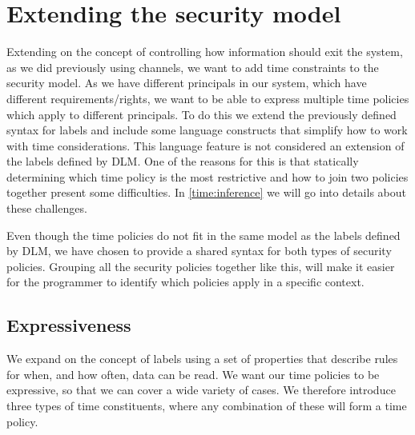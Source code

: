 
\section{Extending the security model}
Extending on the concept of controlling how information should exit the system, as we did previously using channels, we want to add time constraints to the security model.
As we have different principals in our system, which have different requirements/rights, we want to be able to express multiple time policies which apply to different principals.
To do this we extend the previously defined syntax for labels and include some language constructs that simplify how to work with time considerations.
This language feature is not considered an extension of the labels defined by DLM.
One of the reasons for this is that statically determining which time policy is the most restrictive and how to join two policies together present some difficulties.
In \cref{time:inference} we will go into details about these challenges.

Even though the time policies do not fit in the same model as the labels defined by DLM, we have chosen to provide a shared syntax for both types of security policies.
Grouping all the security policies together like this, will make it easier for the programmer to identify which policies apply in a specific context.

\subsection{Expressiveness}\label{time:expressiveness}
We expand on the concept of labels using a set of properties that describe rules for when, and how often, data can be read.
We want our time policies to be expressive, so that we can cover a wide variety of cases.
We therefore introduce three types of time constituents, where any combination of these will form a time policy.

